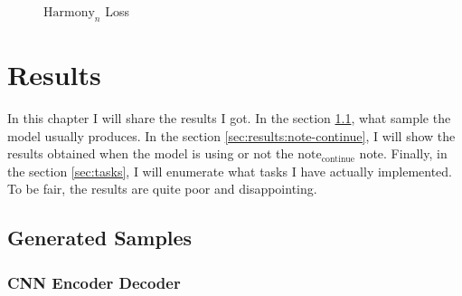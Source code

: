 \documentclass[12pt]{report}
\begin{document}
\begin{figure}[H]
\begin{minipage}{0.5\textwidth}
\begin{center}
        \end{center}
        \caption{$\text{Harmony}_n$ Loss}
        \label{fig:loss_harmony_n}
    \end{minipage}
\end{figure}

\chapter{Results}
\label{chap:results}

In this chapter I will share the results I got.
In the section \ref{sec:results:samples}, what sample the model usually produces.
In the section \ref{sec:results:note-continue}, I will show the results obtained when the model is using or not the $\text{note}_{\text{continue}}$ note.
Finally, in the section \ref{sec:tasks}, I will enumerate what tasks I have actually implemented.
To be fair, the results are quite poor and disappointing.


\section{Generated Samples}
\label{sec:results:samples}

\subsection{CNN Encoder Decoder}
\end{document}
